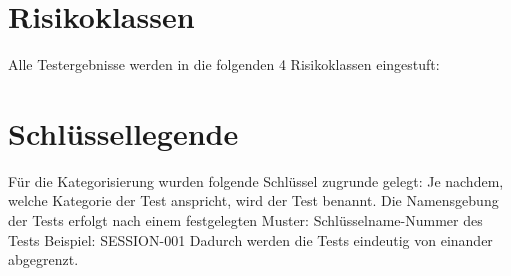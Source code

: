 \section{Risikoklassen}
Alle Testergebnisse werden in die folgenden 4 Risikoklassen eingestuft:
\newline
{}


\section{Schlüssellegende}
Für die Kategorisierung wurden folgende Schlüssel zugrunde gelegt:
\newline
{}
\newline
Je nachdem, welche Kategorie der Test anspricht, wird der Test benannt. Die Namensgebung der Tests erfolgt nach einem festgelegten Muster:
{Schlüsselname}-{Nummer des Tests} 
Beispiel: SESSION-001
Dadurch werden die Tests eindeutig von einander abgegrenzt.
